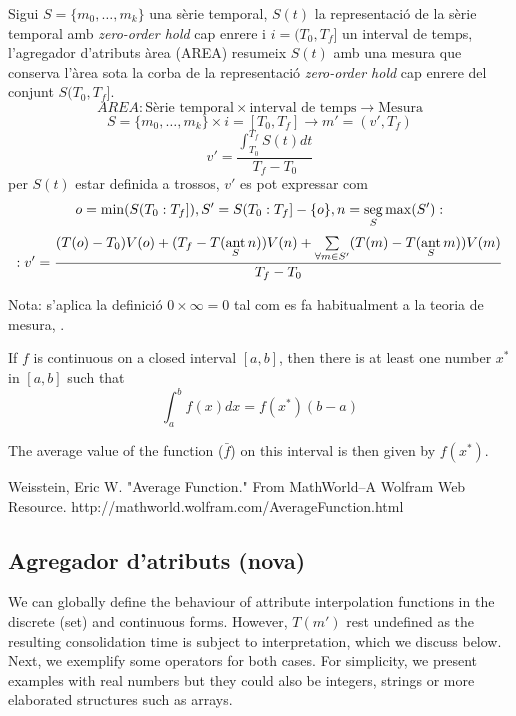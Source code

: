 \begin{definition}
  Sigui $S=\{m_0,\ldots,m_k\}$ una sèrie temporal, $S(t)$ la
  representació de la sèrie temporal amb \emph{zero-order hold} cap
  enrere i $i=(T_0,T_f]$ un interval de temps, l'agregador d'atributs àrea
  (AREA) resumeix $S(t)$ amb una mesura que conserva l'àrea sota la
  corba de la representació \emph{zero-order hold} cap enrere del
  conjunt $S(T_0,T_f]$.
\[
AREA: \text{Sèrie temporal} \times \text{interval de temps} \longrightarrow \text{Mesura}
\]
\[
S=\{m_0,\ldots,m_k\} \times i=[T_0,T_f]  \longrightarrow m'=(v',T_f)
\]
\[
v' = 
\frac{\int_{T_0}^{T_f} S(t) dt}{T_f - T_0}
\]
per $S(t)$ estar definida a trossos, $v'$ es pot expressar com
\[
o=\min(S(T_0:T_f]),
S'= S(T_0:T_f] - \{o\},
n=\seg\limits_S \max(S'): %
\]
\[
:v'= \frac{(T(o)-T_0)V(o) 
+( T_f- T(\operatorname*{ant}\limits_S n) )V(n) 
+\sum\limits_{\forall m \in S'}( T(m)- T(\operatorname*{ant}\limits_S m) )V(m)}
{T_f-T_0} 
\]

Nota: s'aplica la definició $0 \times \infty = 0$ tal com es fa habitualment a la teoria de mesura, \cite{wiki:extendedreal}.
\end{definition}



If $f$ is continuous on a closed interval $[a,b]$, then there is at least one number $x^*$ in $[a,b]$ such that
$$
\int_a^b f(x)dx = f(x^*)(b-a)
$$

The average value of the function ($\bar f$)  on this interval is then given by  $f(x^*)$.

Weisstein, Eric W. "Average Function." From MathWorld--A Wolfram Web Resource. http://mathworld.wolfram.com/AverageFunction.html






\subsection{Agregador d'atributs (nova)}




We can globally define the behaviour of attribute interpolation
functions in the discrete (set) and continuous forms. However, $T(m')$
rest undefined as the resulting consolidation time is subject to
interpretation, which we discuss below. Next, we exemplify some
operators for both cases. For simplicity, we present examples with
real numbers but they could also be integers, strings or more
elaborated structures such as arrays.



